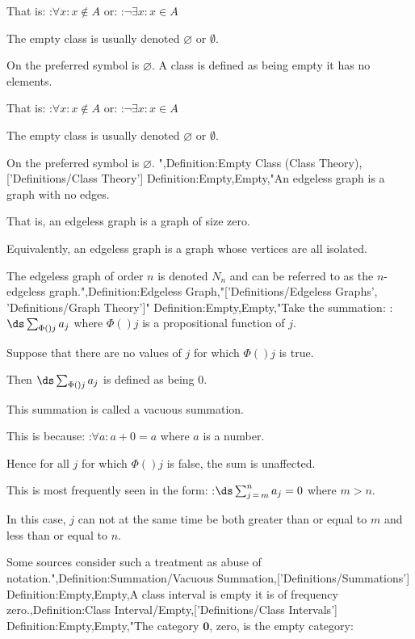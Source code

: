 That is:
:$\forall x: x \notin A$
or:
:$\neg \exists x: x \in A$


The empty class is usually denoted $\varnothing$ or $\emptyset$.

On  the preferred symbol is $\varnothing$.
A class is defined as being empty  it has no elements.

That is:
:$\forall x: x \notin A$
or:
:$\neg \exists x: x \in A$


The empty class is usually denoted $\varnothing$ or $\emptyset$.

On  the preferred symbol is $\varnothing$.
",Definition:Empty Class (Class Theory),['Definitions/Class Theory']
Definition:Empty,Empty,"An edgeless graph is a graph with no edges.

That is, an edgeless graph is a graph of size zero.

Equivalently, an edgeless graph is a graph whose vertices are all isolated.


The edgeless graph of order $n$ is denoted $N_n$ and can be referred to as the $n$-edgeless graph.",Definition:Edgeless Graph,"['Definitions/Edgeless Graphs', 'Definitions/Graph Theory']"
Definition:Empty,Empty,"Take the summation:
:$\ds \sum_{\Phi \left(   \right)j} a_j$
where $\Phi \left(   \right)j$ is a propositional function of $j$.

Suppose that there are no values of $j$ for which $\Phi \left(   \right)j$ is true.

Then $\ds \sum_{\Phi \left(   \right)j} a_j$ is defined as being $0$.

This summation is called a vacuous summation.


This is because:
:$\forall a: a + 0 = a$
where $a$ is a number.

Hence for all $j$ for which $\Phi \left(   \right)j$ is false, the sum is unaffected.


This is most frequently seen in the form:
:$\ds \sum_{j \mathop = m}^n a_j = 0$
where $m > n$.

In this case, $j$ can not at the same time be both greater than or equal to $m$ and less than or equal to $n$.


Some sources consider such a treatment as abuse of notation.",Definition:Summation/Vacuous Summation,['Definitions/Summations']
Definition:Empty,Empty,A class interval is empty  it is of frequency zero.,Definition:Class Interval/Empty,['Definitions/Class Intervals']
Definition:Empty,Empty,"The category $\mathbf 0$, zero, is the empty category:


